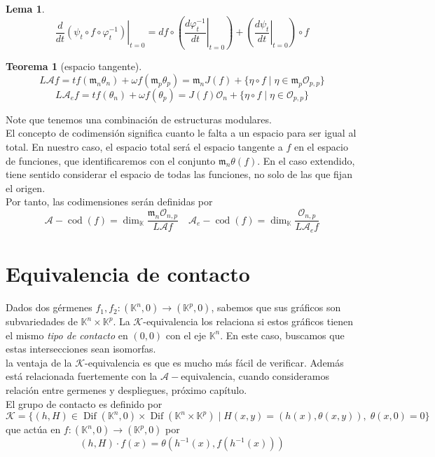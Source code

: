 \documentclass[12pt]{book}
\newtheorem{teo}{Teorema}
\newtheorem{lem}{Lema}
\newcommand{\kg}{\mathcal{K}}
\newcommand{\kp}{(\mathbb{K}^p,0)}
\newcommand{\ag}{\mathcal{A}}
\newcommand{\oo}{\mathcal{O}_n}
\newcommand{\mm}{\mathfrak{m}_n}
\newcommand{\dif}{\operatorname{Dif}}
\newcommand{\knp}{(\mathbb{K}^n \times \mathbb{K}^p)}
\newcommand{\kn}{(\mathbb{K}^n,0)}
\begin{document}
\begin{lem}
$$
\left.\frac{d}{d t}\left(\psi_{t} \circ f \circ \varphi_{t}^{-1}\right)\right|_{t=0}=d f \circ\left(\left.\frac{d \varphi_{t}^{-1}}{d t}\right|_{t=0}\right)+\left(\left.\frac{d \psi_{t}}{d t}\right|_{t=0}\right) \circ f
$$
\end{lem}


\begin{teo}[espacio tangente]
$$ L \ag f = tf (\mm\theta_n)  + \omega f (\mathfrak{m}_p \theta_p ) = \mm J(f) + \{ \eta \circ f \;|  \; \eta \in \mathfrak{m}_p  \mathcal{O}_{p,p}\} $$
$$ L \ag_e f = tf (\theta_n)  + \omega f (\theta_p ) = J(f)\oo + \{ \eta \circ f \;|  \; \eta \in \mathcal{O}_{p,p}\} $$
\end{teo}
Note que tenemos una combinación de estructuras modulares.\\
El concepto de codimensión significa cuanto le falta a un espacio para ser igual al total. En nuestro caso, el espacio total será el espacio tangente a $f$ en el espacio de funciones, que identificaremos con el conjunto $ \mm \theta (f) $. 
En el caso extendido, tiene sentido considerar el espacio de todas las funciones, no solo de las que fijan el origen.\\

Por tanto, las codimensiones serán definidas por $$ \ag-\operatorname{cod} (f) = \dim _{\mathbb{K}} \frac{\mm\mathcal{O}_{n,p}}{L\ag f} \quad  \ag_e -\operatorname{cod} (f) = \dim _{\mathbb{K}} \frac{\mathcal{O}_{n,p}}{L\ag_e f} $$




\section{Equivalencia de contacto}

Dados dos gérmenes $f_1, f_2: \kn \rightarrow \kp$, sabemos que sus gráficos son subvariedades de $\mathbb{K}^n\times \mathbb{K}^p$. La $\kg$-equivalencia los relaciona si estos gráficos tienen el mismo \textit{tipo de contacto} en $(0,0)$ con el eje $\mathbb{K}^n$. En este caso, buscamos que estas intersecciones sean isomorfas.\\
la ventaja de la $\kg$-equivalencia es que es mucho más fácil de verificar. Además está relacionada fuertemente con la $\ag-$equivalencia, cuando consideramos relación entre germenes y despliegues, próximo capítulo.\\


El grupo de contacto es definido por 
$$ \mathcal{K} = \{ (h,H) \in \dif \kn \times \dif \knp \;| \; H(x,y) = (h(x), \theta (x,y)), \; \theta (x,0)=0 \} $$
que actúa en $f: \kn \rightarrow \kp$ por $$ (h,H) \cdot f (x)= \theta (h^{-1}(x), f(h^{-1} (x))) $$
\end{document}
